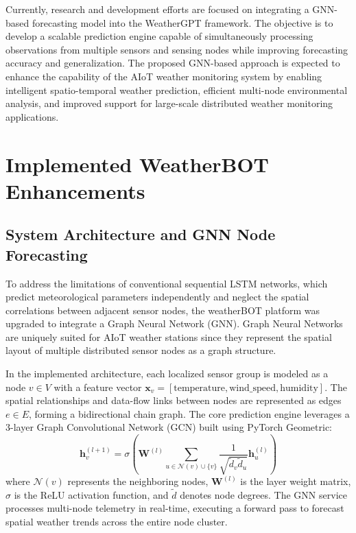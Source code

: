 \documentclass[12pt]{article}
\begin{document}
Currently, research and development efforts are focused on integrating a GNN-based forecasting model into the WeatherGPT framework. The objective is to develop a scalable prediction engine capable of simultaneously processing observations from multiple sensors and sensing nodes while improving forecasting accuracy and generalization. The proposed GNN-based approach is expected to enhance the capability of the AIoT weather monitoring system by enabling intelligent spatio-temporal weather prediction, efficient multi-node environmental analysis, and improved support for large-scale distributed weather monitoring applications.

\section{Implemented WeatherBOT Enhancements}

\subsection{System Architecture and GNN Node Forecasting}
To address the limitations of conventional sequential LSTM networks, which predict meteorological parameters independently and neglect the spatial correlations between adjacent sensor nodes, the weatherBOT platform was upgraded to integrate a Graph Neural Network (GNN). Graph Neural Networks are uniquely suited for AIoT weather stations since they represent the spatial layout of multiple distributed sensor nodes as a graph structure. 

In the implemented architecture, each localized sensor group is modeled as a node $v \in V$ with a feature vector $\mathbf{x}_v = [\text{temperature}, \text{wind\_speed}, \text{humidity}]$. The spatial relationships and data-flow links between nodes are represented as edges $e \in E$, forming a bidirectional chain graph. The core prediction engine leverages a 3-layer Graph Convolutional Network (GCN) built using PyTorch Geometric:
\begin{equation}
    \mathbf{h}_v^{(l+1)} = \sigma \left( \mathbf{W}^{(l)} \sum_{u \in \mathcal{N}(v) \cup \{v\}} \frac{1}{\sqrt{\tilde{d}_v \tilde{d}_u}} \mathbf{h}_u^{(l)} \right)
\end{equation}
where $\mathcal{N}(v)$ represents the neighboring nodes, $\mathbf{W}^{(l)}$ is the layer weight matrix, $\sigma$ is the ReLU activation function, and $\tilde{d}$ denotes node degrees. The GNN service processes multi-node telemetry in real-time, executing a forward pass to forecast spatial weather trends across the entire node cluster.
\end{document}
